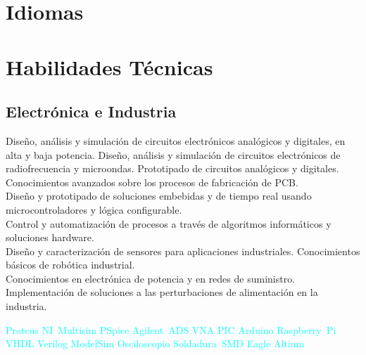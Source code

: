 \documentclass[11pt,a4paper,sans,spanish]{moderncv}
\begin{document}


\section{Idiomas}




 
\section{Habilidades Técnicas}

\subsection{Electrónica e Industria}
Diseño, análisis y simulación de circuitos electrónicos analógicos y digitales, en alta y baja potencia. 
Diseño, análisis y simulación de circuitos electrónicos de radiofrecuencia y microondas.
Prototipado de circuitos analógicos y digitales. Conocimientos avanzados sobre los procesos de fabricación de PCB.
\protect\\[0.3em]
Diseño y prototipado de soluciones embebidas y de tiempo real usando microcontroladores y lógica configurable.
\protect\\[0.3em]
Control y automatización de procesos a través de algoritmos informáticos y soluciones hardware.
\protect\\[0.3em]
Diseño y caracterización de sensores para aplicaciones industriales. Conocimientos básicos de robótica industrial.
\protect\\[0.3em]
Conocimientos en electrónica de potencia y en redes de suministro. Implementación de soluciones a las perturbaciones de alimentación en la industria.

\begin{center}
\textcolor{cyan}{
Proteus \quad{} NI~Multisim \quad{} PSpice \quad{} Agilent~ADS \quad{} VNA \quad{} PIC \quad{} Arduino \quad{} Raspberry~Pi \quad{} VHDL \quad{} Verilog \quad{} ModelSim \quad{} Osciloscopio \quad{} Soldadura~SMD \quad{} Eagle \quad{} Altium
}
\end{center}
\end{document}
